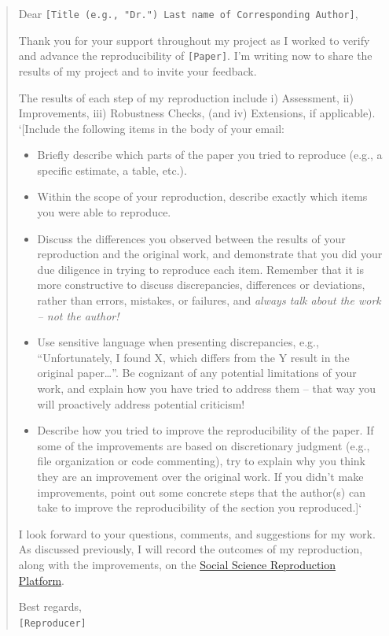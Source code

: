 \documentclass[]{book}
\providecommand{\tightlist}{%
  \setlength{\itemsep}{0pt}\setlength{\parskip}{0pt}}
\begin{document}
\begin{quote}
Dear \texttt{{[}Title\ (e.g.,\ "Dr.")\ Last\ name\ of\ Corresponding\ Author{]}},

Thank you for your support throughout my project as I worked to verify and advance the reproducibility of \texttt{{[}Paper{]}}. I'm writing now to share the results of my project and to invite your feedback.

The results of each step of my reproduction include i) Assessment, ii) Improvements, iii) Robustness Checks, (and iv) Extensions, if applicable).\\
`{[}Include the following items in the body of your email:

\begin{itemize}
\tightlist
\item
  Briefly describe which parts of the paper you tried to reproduce (e.g., a specific estimate, a table, etc.).\\
\item
  Within the scope of your reproduction, describe exactly which items you were able to reproduce.\\
\item
  Discuss the differences you observed between the results of your reproduction and the original work, and demonstrate that you did your due diligence in trying to reproduce each item. Remember that it is more constructive to discuss discrepancies, differences or deviations, rather than errors, mistakes, or failures, and \emph{always talk about the work -- not the author!}\\
\item
  Use sensitive language when presenting discrepancies, e.g., ``Unfortunately, I found X, which differs from the Y result in the original paper\ldots{}''. Be cognizant of any potential limitations of your work, and explain how you have tried to address them -- that way you will proactively address potential criticism!\\
\item
  Describe how you tried to improve the reproducibility of the paper. If some of the improvements are based on discretionary judgment (e.g., file organization or code commenting), try to explain why you think they are an improvement over the original work. If you didn't make improvements, point out some concrete steps that the author(s) can take to improve the reproducibility of the section you reproduced.{]}`
\end{itemize}

I look forward to your questions, comments, and suggestions for my work. As discussed previously, I will record the outcomes of my reproduction, along with the improvements, on the \href{https://www.socialsciencereproduction.org/}{Social Science Reproduction Platform}.

Best regards,\\
\texttt{{[}Reproducer{]}}
\end{quote}
\end{document}
